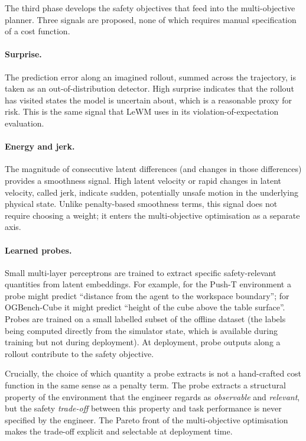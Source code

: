 \documentclass[a4paper,twoside,12pt]{report}
\begin{document}
The third phase develops the safety objectives that feed into the multi-objective planner. Three signals are proposed, none of which requires manual specification of a cost function.

\paragraph{Surprise.} The prediction error along an imagined rollout, summed across the trajectory, is taken as an out-of-distribution detector. High surprise indicates that the rollout has visited states the model is uncertain about, which is a reasonable proxy for risk. This is the same signal that LeWM uses in its violation-of-expectation evaluation.

\paragraph{Energy and jerk.} The magnitude of consecutive latent differences (and changes in those differences) provides a smoothness signal. High latent velocity or rapid changes in latent velocity, called jerk, indicate sudden, potentially unsafe motion in the underlying physical state. Unlike penalty-based smoothness terms, this signal does not require choosing a weight; it enters the multi-objective optimisation as a separate axis.

\paragraph{Learned probes.} Small multi-layer perceptrons are trained to extract specific safety-relevant quantities from latent embeddings. For example, for the Push-T environment a probe might predict ``distance from the agent to the workspace boundary''; for OGBench-Cube it might predict ``height of the cube above the table surface''. Probes are trained on a small labelled subset of the offline dataset (the labels being computed directly from the simulator state, which is available during training but not during deployment). At deployment, probe outputs along a rollout contribute to the safety objective.

Crucially, the choice of which quantity a probe extracts is not a hand-crafted cost function in the same sense as a penalty term. The probe extracts a structural property of the environment that the engineer regards as \emph{observable} and \emph{relevant}, but the safety \emph{trade-off} between this property and task performance is never specified by the engineer. The Pareto front of the multi-objective optimisation makes the trade-off explicit and selectable at deployment time.
\end{document}
